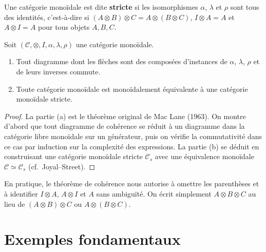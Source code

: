 \begin{definition}\label{def:monoidale-stricte}
Une catégorie monoïdale est dite \textbf{stricte} si les isomorphismes
$\alpha$, $\lambda$ et $\rho$ sont tous des identités, c'est-à-dire
si $(A \otimes B) \otimes C = A \otimes (B \otimes C)$,
$I \otimes A = A$ et $A \otimes I = A$ pour tous objets $A, B, C$.
\end{definition}

\begin{theoreme}\label{thm:coherence-maclane}
Soit $(\mathcal{C}, \otimes, I, \alpha, \lambda, \rho)$ une catégorie
monoïdale.
\begin{enumerate}[label=(\alph*)]
\item Tout diagramme dont les flèches sont des composées d'instances de
      $\alpha$, $\lambda$, $\rho$ et de leurs inverses commute.
\item Toute catégorie monoïdale est monoïdalement équivalente à une
      catégorie monoïdale stricte.
\end{enumerate}
\end{theoreme}

\begin{proof}
La partie (a) est le théorème original de Mac Lane (1963).
On montre d'abord que tout diagramme de cohérence se réduit à un diagramme
dans la catégorie libre monoïdale sur un générateur, puis on vérifie
la commutativité dans ce cas par induction sur la complexité des
expressions.  La partie (b) se déduit en construisant une catégorie
monoïdale stricte $\mathcal{C}_s$ avec une équivalence monoïdale
$\mathcal{C} \simeq \mathcal{C}_s$ (cf.\ Joyal--Street).
\end{proof}

\begin{remarque}\label{rem:coherence-pratique}
En pratique, le théorème de cohérence nous autorise à omettre les
parenthèses et à identifier $I \otimes A$, $A \otimes I$ et $A$
sans ambiguïté.  On écrit simplement $A \otimes B \otimes C$
au lieu de $(A \otimes B) \otimes C$ ou $A \otimes (B \otimes C)$.
\end{remarque}

\section{Exemples fondamentaux}\label{sec:monoidale-exemples}

